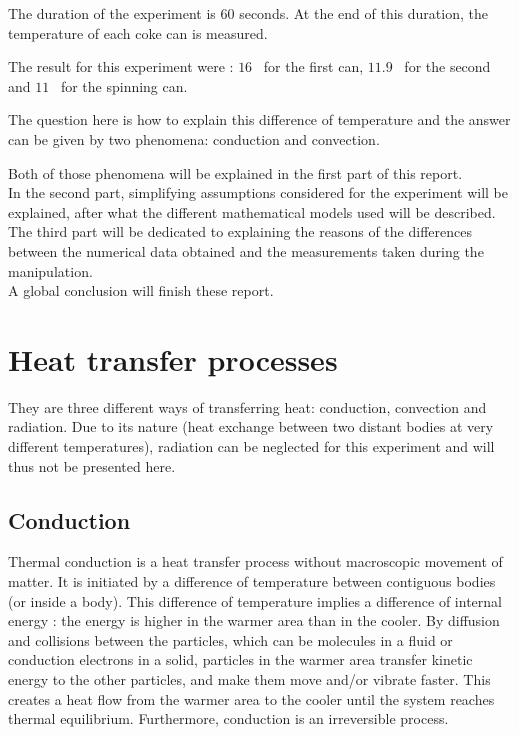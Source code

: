 \documentclass{report}
\begin{document}
	The duration of the experiment is $60$ seconds.	At the end of this duration, the temperature of each coke can is measured. 
	
	The result for this experiment were : $16$ \textcelsius\ for the first can, $11.9$ \textcelsius\ for the second and $11$ \textcelsius\ for the spinning can.
	
	The question here is how to explain this difference of temperature and the answer can be given by two phenomena: conduction and convection.

	Both of those phenomena will be explained in the first part of this report.\\
	In the second part, simplifying assumptions considered for the experiment will be explained, after what the different mathematical models used will be described.\\
	The third part will be dedicated to explaining the reasons of the differences between the numerical data obtained and the measurements taken during the manipulation.\\
	A global conclusion will finish these report.
	
	\chapter{Heat transfer processes}\label{htp}
	
	They are three different ways of transferring heat: conduction, convection and radiation. Due to its nature (heat exchange between two distant bodies at very different temperatures), radiation can be neglected for this experiment and will thus not be presented here.
	
	\section{Conduction}\label{cd}
	
	Thermal conduction is a heat transfer process without macroscopic movement of matter. It is initiated by a difference of temperature between contiguous bodies (or inside a body). This difference of temperature implies a difference of internal energy : the energy is higher in the warmer area than in the cooler. By diffusion and collisions between the particles, which can be molecules in a fluid or conduction electrons in a solid, particles in the warmer area transfer kinetic energy to the other particles, and make them move and/or vibrate faster. This creates a heat flow from the warmer area to the cooler until the system reaches thermal equilibrium. Furthermore, conduction is an irreversible process.
	
\end{document}
